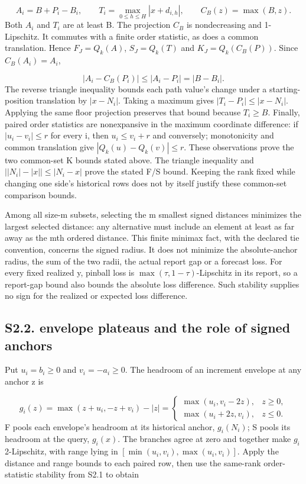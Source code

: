 \documentclass[11pt,a4paper]{article}
\begin{document}
\[
A_i=B+P_i-B_i,\qquad T_i=\max_{0\le h\le H}|x+d_{i,h}|,\qquad C_B(z)=\max(B,z).
\]
Both \(A_i\) and \(T_i\) are at least B. The projection \(C_B\) is nondecreasing and 1-Lipschitz. It commutes with a finite order statistic, as does a common translation. Hence \(F_J=Q_k(A)\), \(S_J=Q_k(T)\) and \(K_J=Q_k(C_B(P))\). Since \(C_B(A_i)=A_i\),

\[
|A_i-C_B(P_i)|\le |A_i-P_i|=|B-B_i|.
\]
The reverse triangle inequality bounds each path value's change under a starting-position translation by \(|x-N_i|\). Taking a maximum gives \(|T_i-P_i|\le|x-N_i|\). Applying the same floor projection preserves that bound because \(T_i\ge B\). Finally, paired order statistics are nonexpansive in the maximum coordinate difference: if \(|u_i-v_i|\le r\) for every i, then \(u_i\le v_i+r\) and conversely; monotonicity and common translation give \(|Q_k(u)-Q_k(v)|\le r\). These observations prove the two common-set K bounds stated above. The triangle inequality and \(\bigl||N_i|-|x|\bigr|\le|N_i-x|\) prove the stated F/S bound. Keeping the rank fixed while changing one side's historical rows does not by itself justify these common-set comparison bounds.

Among all size-m subsets, selecting the m smallest signed distances minimizes the largest selected distance: any alternative must include an element at least as far away as the mth ordered distance. This finite minimax fact, with the declared tie convention, concerns the signed radius. It does not minimize the absolute-anchor radius, the sum of the two radii, the actual report gap or a forecast loss. For every fixed realized y, pinball loss is \(\max(\tau,1-\tau)\)-Lipschitz in its report, so a report-gap bound also bounds the absolute loss difference. Such stability supplies no sign for the realized or expected loss difference.

\subsection*{S2.2. envelope plateaus and the role of signed anchors}
Put \(u_i=b_i\ge0\) and \(v_i=-a_i\ge0\). The headroom of an increment envelope at any anchor z is

\[
g_i(z)=\max(z+u_i,-z+v_i)-|z|=\begin{cases}\max(u_i,v_i-2z),&z\ge0,\\\max(u_i+2z,v_i),&z\le0.\end{cases}
\]
F pools each envelope's headroom at its historical anchor, \(g_i(N_i)\); S pools its headroom at the query, \(g_i(x)\). The branches agree at zero and together make \(g_i\) 2-Lipschitz, with range lying in \([\min(u_i,v_i),\max(u_i,v_i)]\). Apply the distance and range bounds to each paired row, then use the same-rank order-statistic stability from S2.1 to obtain
\end{document}
